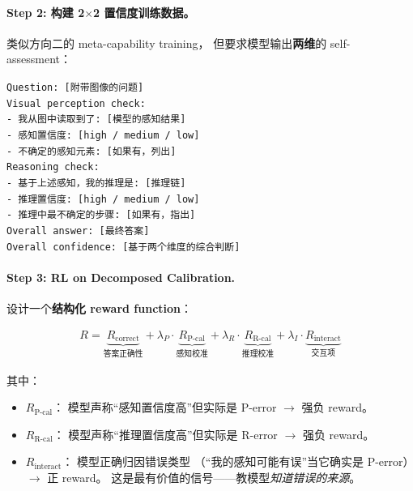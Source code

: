 \documentclass[12pt,a4paper]{article}
\begin{document}
\paragraph{Step 2: 构建 2$\times$2 置信度训练数据。}

类似方向二的 meta-capability training，
但要求模型输出\textbf{两维}的 self-assessment：

\begin{tcolorbox}[colback=gray!5,colframe=gray!50,boxrule=0.3pt,left=4pt,right=4pt]
\small
\texttt{Question: [附带图像的问题]}\\[3pt]
\texttt{Visual perception check:}\\
\texttt{- 我从图中读取到了: [模型的感知结果]}\\
\texttt{- 感知置信度: [high / medium / low]}\\
\texttt{- 不确定的感知元素: [如果有，列出]}\\[3pt]
\texttt{Reasoning check:}\\
\texttt{- 基于上述感知，我的推理是: [推理链]}\\
\texttt{- 推理置信度: [high / medium / low]}\\
\texttt{- 推理中最不确定的步骤: [如果有，指出]}\\[3pt]
\texttt{Overall answer: [最终答案]}\\
\texttt{Overall confidence: [基于两个维度的综合判断]}
\end{tcolorbox}

\paragraph{Step 3: RL on Decomposed Calibration.}

设计一个\textbf{结构化 reward function}：

\begin{align}
R = \underbrace{R_{\text{correct}}}_{\text{答案正确性}}
  + \lambda_P \cdot \underbrace{R_{\text{P-cal}}}_{\text{感知校准}}
  + \lambda_R \cdot \underbrace{R_{\text{R-cal}}}_{\text{推理校准}}
  + \lambda_I \cdot \underbrace{R_{\text{interact}}}_{\text{交互项}}
\end{align}

\noindent
其中：
\begin{itemize}[leftmargin=2em]
  \item $R_{\text{P-cal}}$：
    模型声称``感知置信度高''但实际是 P-error $\rightarrow$ 强负 reward。
  \item $R_{\text{R-cal}}$：
    模型声称``推理置信度高''但实际是 R-error $\rightarrow$ 强负 reward。
  \item $R_{\text{interact}}$：
    模型正确归因错误类型
    （``我的感知可能有误''当它确实是 P-error）$\rightarrow$ 正 reward。
    这是最有价值的信号——教模型\textit{知道错误的来源}。
\end{itemize}
\end{document}
